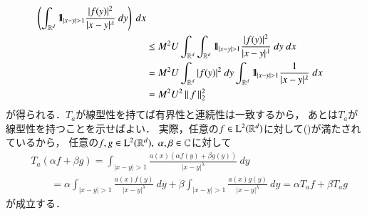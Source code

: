 \begin{prf}
\begin{description}
\begin{align}
						\left( \int_{\mathbb{R}^d} \mbox{1}\hspace{-0.25em}\mbox{l}_{|x-y| > 1} \frac{|f(y)|^2}{|x-y|^{\lambda}}\ dy \right)\ dx \\
					&\leq M^2 U \int_{\mathbb{R}^d} \int_{\mathbb{R}^d} \mbox{1}\hspace{-0.25em}\mbox{l}_{|x-y| > 1} \frac{|f(y)|^2}{|x-y|^{\lambda}}\ dy\ dx \\
					&= M^2 U \int_{\mathbb{R}^d} |f(y)|^2\ dy \int_{\mathbb{R}^d} \mbox{1}\hspace{-0.25em}\mbox{l}_{|x-y| > 1} \frac{1}{|x-y|^{\lambda}}\ dx \\
					&= M^2 U^2 \left\|\, f\, \right\|_{2}^2
					\label{eq:report_6_1}
 				\end{align}
 				が得られる．$T_a$が線型性を持てば有界性と連続性は一致するから，
 				あとは$T_a$が線型性を持つことを示せばよい．
 				実際，任意の$f \in \mathrm{L}^2(\mathbb{R}^d)$に対して()が満たされているから，
 				任意の$f,g \in \mathrm{L}^2(\mathbb{R}^d),\ \alpha, \beta \in \mathbb{C}$に対して
 				\begin{align}
 					&T_a (\alpha f + \beta g)
 					= \int_{|x - y| > 1} \frac{a(x)\left( \alpha f(y) + \beta g(y) \right)}{|x-y|^\lambda}\ dy \\
 					&\qquad = \alpha \int_{|x - y| > 1} \frac{a(x) f(y)}{|x-y|^\lambda}\ dy
 						+ \beta \int_{|x - y| > 1} \frac{a(x) g(y)}{|x-y|^\lambda}\ dy
 					= \alpha T_a f + \beta T_a g
 				\end{align}
 				が成立する．
 				

\end{description}
\end{prf}
